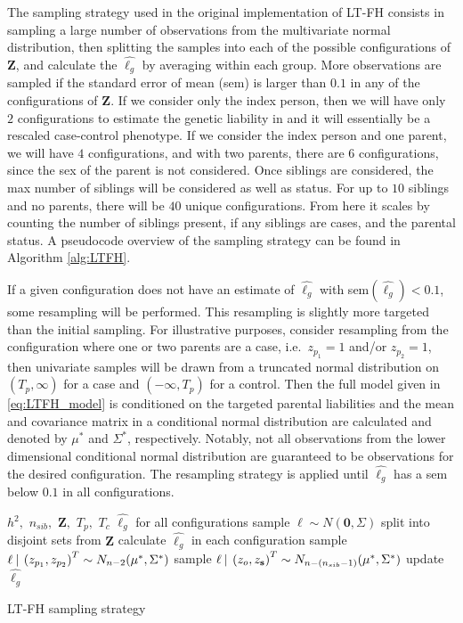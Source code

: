 The sampling strategy used in the original implementation of LT-FH consists in sampling a large number of observations from the multivariate normal distribution, then splitting the samples into each of the possible configurations of $ \mathbf{Z} $, and calculate the $ \hat{\ell_g} $ by averaging within each group. More observations are sampled if the standard error of mean (sem) is larger than $ 0.1 $ in any of the configurations of $ \mathbf{Z} $. If we consider only the index person, then we will have only $ 2 $ configurations to estimate the genetic liability in and it will essentially be a rescaled case-control phenotype. If we consider the index person and one parent, we will have $ 4 $ configurations, and with two parents, there are $ 6 $ configurations, since the sex of the parent is not considered. Once siblings are considered, the max number of siblings will be considered as well as status. For up to $ 10 $ siblings and no parents, there will be $ 40 $ unique configurations. From here it scales by counting the number of siblings present, if any siblings are cases, and the parental status. A pseudocode overview of the sampling strategy can be found in Algorithm \ref{alg:LTFH}.

If a given configuration does not have an estimate of $ \hat{\ell_g} $ with sem$(\hat{\ell_g}) < 0.1 $, some resampling will be performed. This resampling is slightly more targeted than the initial sampling. For illustrative purposes, consider resampling from the configuration where one or two parents are a case, i.e.\ $ z_{p_1}  = 1$ and/or $ z_{p_2} = 1$, then univariate samples will be drawn from a truncated normal distribution on $ (T_p, \infty) $ for a case and $ (-\infty, T_p) $ for a control. Then the full model given in \cref{eq:LTFH_model} is conditioned on the targeted parental liabilities and the mean and covariance matrix in a conditional normal distribution are calculated and denoted by $ \mu^{\ast} $ and $ \Sigma^{\ast} $, respectively. Notably, not all observations from the lower dimensional conditional normal distribution are guaranteed to be observations for the desired configuration. The resampling strategy is applied until $ \hat{\ell_g} $ has a sem below $ 0.1 $ in all configurations.

\begin{algorithm}[h] 
\begin{algorithmic}[1] 
\INPUT $ h^2,$  $n_{sib},$  $\mathbf{Z},$  $T_p,$  $T_c$ 
\OUTPUT $ \hat{\ell_g} $ for all configurations
\STATE sample $ \ell \sim N(\mathbf{0}, \Sigma) $ 
\STATE split into disjoint sets from $ \mathbf{Z} $
\STATE calculate $ \hat{\ell_g} $ in each configuration 
		\STATE sample  $ \ell \:\vert\: \left(z_{p_1}, z_{p_2} \right)^T \sim N_{n-2}(\mu^{\ast}, \Sigma^{\ast}) $
		\STATE sample $ \ell \:\vert\: \left(z_{o}, z_{\mathbf{s}} \right)^T \sim N_{n-(n_{sib} - 1)}(\mu^{\ast}, \Sigma^{\ast}) $
	\ENDIF	
	\STATE update $ \hat{\ell_g} $
\ENDWHILE
\end{algorithmic}
\caption{LT-FH sampling strategy}
\label{alg:LTFH}
\end{algorithm}



